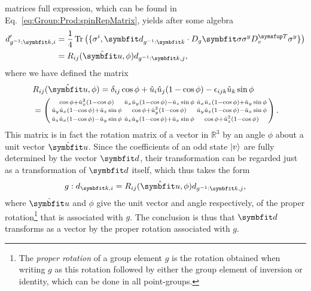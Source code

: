 matrices full expression, which
can be found in  Eq.~\eqref{eq:Group:Prod:spinRepMatrix}, yields after some algebra
\begin{equation}
    \label{eq:Group:pdRep:transformedD}
    \begin{split}
        d'_{g^{-1}:\v{k},i} &= \frac{1}{4}\tr\big(\{\sigma^i, \v{d}_{g^{-1}:\v{k}}\cdot D_g\v{\sigma}\sigma^yD_v^\trans\sigma^y\}\big)\\
        &= R_{ij}(\hat{\v{u}},\phi)d_{g^{-1}:\v{k},j},
    \end{split}
\end{equation}
where we have defined the matrix
\begin{equation}
    \label{eq:Group:pdRep:rotMatrixIndices}
    \begin{split}
        &R_{ij}(\hat{\v{u}},\phi) = \delta_{ij}\cos\phi + \hat{u}_i\hat{u}_j(1-\cos\phi)-\epsilon_{ijk}\hat{u}_k\sin\phi\\
        & = 
        \left(\begin{smallmatrix}
            \cos\phi + \hat{u}_x^2(1-\cos\phi) & \hat{u}_x\hat{u}_y(1-\cos\phi)-\hat{u}_z\sin\phi & \hat{u}_x\hat{u}_z(1-\cos\phi)+\hat{u}_y\sin\phi\\
            \hat{u}_y\hat{u}_x(1-\cos\phi)+\hat{u}_z\sin\phi & \cos\phi+\hat{u}_y^2(1-\cos\phi) & \hat{u}_y\hat{u}_z(1-\cos\phi)-\hat{u}_x\sin\phi\\
            \hat{u}_z\hat{u}_x(1-\cos\phi)-\hat{u}_y\sin\phi & \hat{u}_z\hat{u}_y(1-\cos\phi)+\hat{u}_x\sin\phi & \cos\phi+\hat{u}_z^2(1-\cos\phi)
        \end{smallmatrix}\right).
    \end{split}
\end{equation}
This matrix is in fact the rotation matrix of a vector in $\mathbb{R}^3$ by an angle $\phi$ about a unit vector $\hat{\v{u}}$. Since the coefficients
 of an odd state $\lvert v \rangle$ are fully determined by the vector $\v{d}$, their transformation can be regarded just as a transformation of $\v{d}$ itself,
 which thus takes the form
\begin{equation}
    \label{eq:Group:pdRep:dTransformation}
    g:d_{\v{k},i} = R_{ij}(\hat{\v{u}},\phi)d_{g^{-1}:\v{k},j},
\end{equation}
where $\hat{\v{u}}$ and $\phi$ give the unit vector and angle respectively, of the proper rotation\footnote{The \emph{proper rotation} of a group element $g$ is
the rotation obtained when writing $g$ as this rotation followed by either the group element of inversion or identity, which can be done in all point-groups.} that
is associated with $g$. The conclusion is thus that
$\v{d}$ transforms as a vector by the proper rotation associated with $g$.


